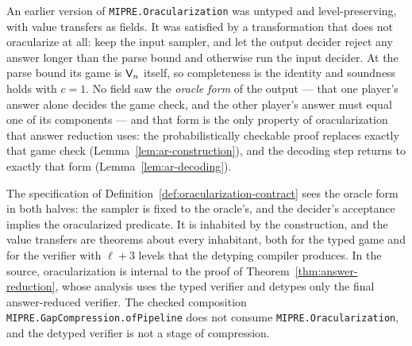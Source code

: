 \begin{remark}
\label{rem:oracularization-contract}
An earlier version of \texttt{MIPRE.Oracularization} was untyped and level-preserving, with value
transfers as fields. It was satisfied by a transformation that does not oracularize at all: keep
the input sampler, and let the output decider reject any answer longer than the parse bound and
otherwise run the input decider. At the parse bound its game is $\mathsf{V}_n$ itself, so
completeness is the identity and soundness holds with $c = 1$. No field saw the \emph{oracle
form} of the output --- that one player's answer alone decides the game check, and the other
player's answer must equal one of its components --- and that form is the only property of
oracularization that answer reduction uses: the probabilistically checkable proof replaces
exactly that game check (Lemma~\ref{lem:ar-construction}), and the decoding step returns to
exactly that form (Lemma~\ref{lem:ar-decoding}).

The specification of Definition~\ref{def:oracularization-contract} sees the oracle form in both
halves: the sampler is fixed to the oracle's, and the decider's acceptance implies the
oracularized predicate. It is inhabited by the construction, and the value transfers are theorems
about every inhabitant, both for the typed game and for the verifier with $\ell + 3$ levels that
the detyping compiler produces. In the source, oracularization is internal to the proof of
Theorem~\ref{thm:answer-reduction}, whose analysis uses the typed verifier and detypes only the
final answer-reduced verifier. The checked composition \texttt{MIPRE.GapCompression.ofPipeline}
does not consume \texttt{MIPRE.Oracularization}, and the detyped verifier is not a stage of
compression.
\end{remark}

